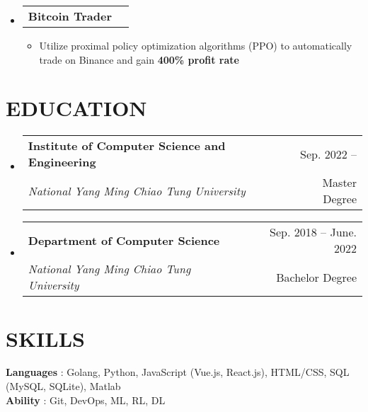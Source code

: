 \documentclass[letterpaper,11pt]{article}
\makeatletter
\newcommand{\resumeItem}[1]{
  \item\small{
    {#1 \vspace{-1pt}}
  }
}
\newcommand{\resumeSubheading}[4]{
  \vspace{-1pt}\item
    \begin{tabular*}{\textwidth}[t]{l@{\extracolsep{\fill}}r}
      \textbf{#1} & {\color{dark-grey}\small #2}\vspace{1pt}\\ %
      \textit{#3} & {\color{dark-grey} \small #4}\\ %
    \end{tabular*}\vspace{-4pt}
}
\newcommand{\resumeProjectHeading}[2]{
    \item
    \begin{tabular*}{\textwidth}{l@{\extracolsep{\fill}}r}
      #1 & {\color{dark-grey}} \\
    \end{tabular*}\vspace{-4pt}
}
\newcommand{\resumeSubHeadingListStart}{\begin{itemize}[leftmargin=0in, label={}]}
\newcommand{\resumeSubHeadingListEnd}{\end{itemize}}
\newcommand{\resumeItemListStart}{\begin{itemize}}
\newcommand{\resumeItemListEnd}{\end{itemize}\vspace{0pt}}
\makeatother
\begin{document}
    \resumeSubHeadingListStart
        \resumeProjectHeading
          {\textbf{Bitcoin Trader} \href{https://arxiv.org/abs/1707.06347}{\faFile}}{}
          \resumeItemListStart
            \resumeItem{Utilize proximal policy optimization algorithms (PPO) to automatically trade on Binance and gain \textbf{400\% profit rate} }
          \resumeItemListEnd
    \resumeSubHeadingListEnd



\section {EDUCATION}
  \resumeSubHeadingListStart
  \resumeSubheading
    {Institute of Computer Science and Engineering}{Sep. 2022 -- }
    {National Yang Ming Chiao Tung University}{Master Degree}
  \resumeSubHeadingListEnd
  \resumeSubHeadingListStart
    \resumeSubheading
      {Department of Computer Science}{Sep. 2018 -- June. 2022}
      {National Yang Ming Chiao Tung University}{Bachelor Degree}
  \resumeSubHeadingListEnd


%
\section{SKILLS}
 \begin{itemize}[leftmargin=0in, label={}]
    \small{\item{
     \textbf{Languages} {: Golang, Python, JavaScript (Vue.js, React.js), HTML/CSS, SQL (MySQL, SQLite), Matlab}\vspace{2pt} \\
     \textbf{Ability}   {: Git, DevOps, ML, RL, DL}
    }}
 \end{itemize}


\end{document}
